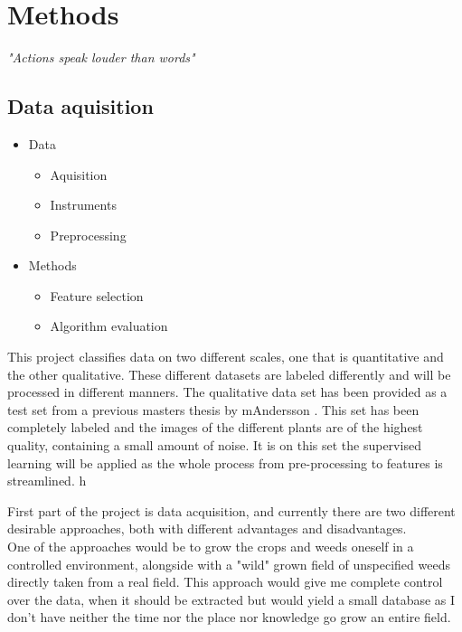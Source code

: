 \chapter{Methods}
\begin{center}
\vspace{-6ex}
\textit{"Actions speak louder than words"}
\vspace{6ex}
\end{center}

\section{Data aquisition}

\begin{itemize}
    \item Data
    \begin{itemize}
        \item Aquisition
        \item Instruments
        \item Preprocessing
    \end{itemize}
    \item Methods
    \begin{itemize}
        \item Feature selection
        \item Algorithm evaluation
    \end{itemize}
\end{itemize}

This project classifies data on two different scales, one that is quantitative and the other qualitative. These different datasets are labeled differently and will be processed in different manners. The qualitative data set has been provided as a test set from a previous masters thesis by mAndersson \cite{m_nadersson}. This set has been completely labeled and the images of the different plants are of the highest quality, containing a small amount of noise. It is on this set the supervised learning will be applied as the whole process from pre-processing to features is streamlined. h

First part of the project is data acquisition, and currently there are two different desirable approaches, both with different advantages and disadvantages.\\

One of the approaches would be to grow the crops and weeds oneself in a controlled environment, alongside with a "wild" grown field of unspecified weeds directly taken from a real field. This approach would give me complete control over the data, when it should be extracted but would yield a small database as I don't have neither the time nor the place nor knowledge go grow an entire field.\\

